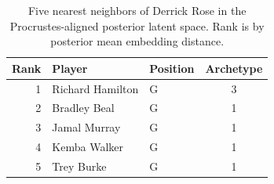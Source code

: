 \begin{table}[htbp]
  \centering\small
  \begin{tabular}{rllc}
    \toprule
    Rank & Player & Position & Archetype \\
    \midrule
    1 & Richard Hamilton & G & 3 \\
    2 & Bradley Beal & G & 1 \\
    3 & Jamal Murray & G & 1 \\
    4 & Kemba Walker & G & 1 \\
    5 & Trey Burke & G & 1 \\
    \bottomrule
  \end{tabular}
  \caption{Five nearest neighbors of Derrick Rose in the Procrustes-aligned posterior latent space. Rank is by posterior mean embedding distance.}
  \label{tab:Derrick_Rose_neighbors}
\end{table}

